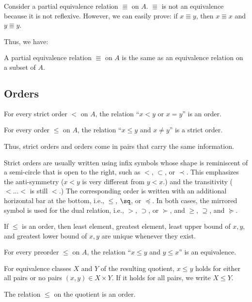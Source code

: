 Consider a partial equivalence relation $\Equiv$ on $A$.
$\Equiv$ is not an equivalence because it is not reflexive.
However, we can easily prove: if $x \Equiv y$, then $x\Equiv x$ and $y\Equiv y$.

Thus, we have:
\begin{theorem}\label{thm:math:per}
A partial equivalence relation $\Equiv$ on $A$ is the same as an equivalence relation on a subset of $A$.
\end{theorem}


\subsection{Orders}

\begin{theorem}
For every strict order $<$ on $A$, the relation ``$x<y$ or $x=y$'' is an order.

For every order $\leq$ on $A$, the relation ``$x\leq y$ and $x\neq y$'' is a strict order.
\end{theorem}

Thus, strict orders and orders come in pairs that carry the same information.

Strict orders are usually written using infix symbols whose shape is reminiscent of a semi-circle that is open to the right, such as $<$, $\subset$, or $\prec$.
This emphasizes the anti-symmetry ($x< y$ is very different from $y<x$.) and the transitivity ($< \ldots <$ is still $<$.)
The corresponding order is written with an additional horizontal bar at the bottom, i.e., $\leq$, $\sq$, or $\preceq$.
In both cases, the mirrored symbol is used for the dual relation, i.e., $>$, $\supset$, or $\succ$, and $\geq$, $\supseteq$, and $\succeq$. 

\begin{theorem}\label{thm:math:binrel}
If $\leq$ is an order, then least element, greatest element, least upper bound of $x,y$, and greatest lower bound of $x,y$ are unique whenever they exist.
\end{theorem}

\begin{theorem}
For every preorder $\leq$ on $A$, the relation ``$x\leq y$ and $y\leq x$'' is an equivalence.

For equivalence classes $X$ and $Y$ of the resulting quotient, $x\leq y$ holds for either all pairs or no pairs $(x,y)\in X\times Y$.
If it holds for all pairs, we write $X\leq Y$.

The relation $\leq$ on the quotient is an order.
\end{theorem}

